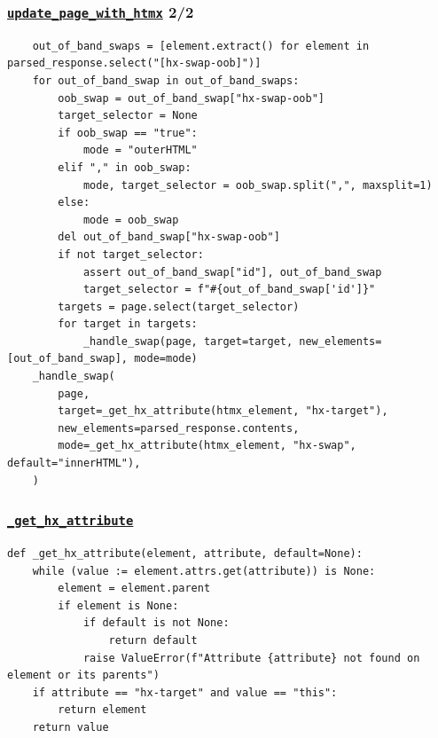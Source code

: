 \documentclass{beamer}
\begin{document}
\begin{frame}[fragile]
    \frametitle{\href{https://github.com/gip-inclusion/les-emplois/blob/9d800e6b3c8a814f17303157966830a0411db8e5/tests/utils/htmx/test.py\#L64}{\texttt{update\_page\_with\_htmx}} \hfill 2/2}
    \begin{verbatim}
    out_of_band_swaps = [element.extract() for element in parsed_response.select("[hx-swap-oob]")]
    for out_of_band_swap in out_of_band_swaps:
        oob_swap = out_of_band_swap["hx-swap-oob"]
        target_selector = None
        if oob_swap == "true":
            mode = "outerHTML"
        elif "," in oob_swap:
            mode, target_selector = oob_swap.split(",", maxsplit=1)
        else:
            mode = oob_swap
        del out_of_band_swap["hx-swap-oob"]
        if not target_selector:
            assert out_of_band_swap["id"], out_of_band_swap
            target_selector = f"#{out_of_band_swap['id']}"
        targets = page.select(target_selector)
        for target in targets:
            _handle_swap(page, target=target, new_elements=[out_of_band_swap], mode=mode)
    _handle_swap(
        page,
        target=_get_hx_attribute(htmx_element, "hx-target"),
        new_elements=parsed_response.contents,
        mode=_get_hx_attribute(htmx_element, "hx-swap", default="innerHTML"),
    )
    \end{verbatim}
\end{frame}

\begin{frame}[fragile]
    \frametitle{\href{https://github.com/gip-inclusion/les-emplois/blob/9d800e6b3c8a814f17303157966830a0411db8e5/tests/utils/htmx/test.py\#L52}{\texttt{\_get\_hx\_attribute}}}
    \begin{verbatim}
def _get_hx_attribute(element, attribute, default=None):
    while (value := element.attrs.get(attribute)) is None:
        element = element.parent
        if element is None:
            if default is not None:
                return default
            raise ValueError(f"Attribute {attribute} not found on element or its parents")
    if attribute == "hx-target" and value == "this":
        return element
    return value
    \end{verbatim}
\end{frame}
\end{document}
